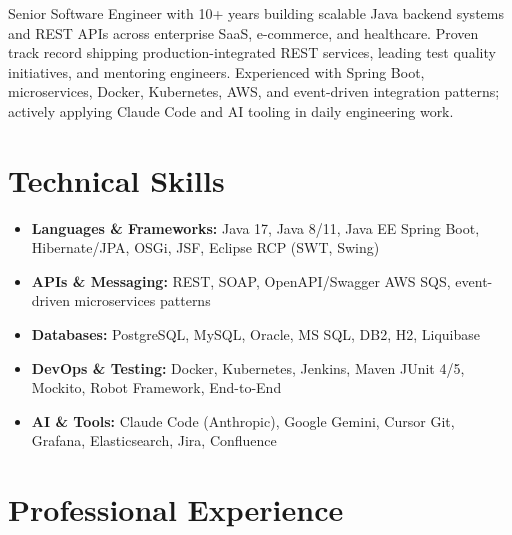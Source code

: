 \documentclass[10pt,a4paper,sans]{moderncv}
\begin{document}
\makecvtitle
\vspace{-10pt}

\small{Senior Software Engineer with 10+ years building scalable Java backend systems and REST APIs across enterprise SaaS, e-commerce, and healthcare. Proven track record shipping production-integrated REST services, leading test quality initiatives, and mentoring engineers. Experienced with Spring Boot, microservices, Docker, Kubernetes, AWS, and event-driven integration patterns; actively applying Claude Code and AI tooling in daily engineering work.}

\vspace{2pt}

\section{Technical Skills}
\vspace{1pt}
\begin{itemize}
  \item \textbf{Languages \& Frameworks:} Java 17, Java 8/11, Java EE \textbar{} Spring Boot, Hibernate/JPA, OSGi, JSF, Eclipse RCP (SWT, Swing)
  \item \textbf{APIs \& Messaging:} REST, SOAP, OpenAPI/Swagger \textbar{} AWS SQS, event-driven microservices patterns
  \item \textbf{Databases:} PostgreSQL, MySQL, Oracle, MS SQL, DB2, H2, Liquibase
  \item \textbf{DevOps \& Testing:} Docker, Kubernetes, Jenkins, Maven \textbar{} JUnit 4/5, Mockito, Robot Framework, End-to-End
  \item \textbf{AI \& Tools:} Claude Code (Anthropic), Google Gemini, Cursor \textbar{} Git, Grafana, Elasticsearch, Jira, Confluence
\end{itemize}

\section{Professional Experience}
\vspace{1pt}
\end{document}
